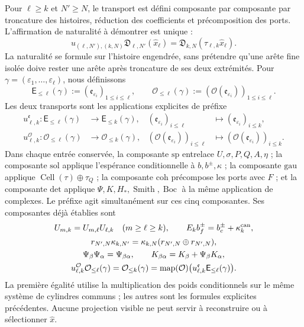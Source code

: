 Pour \(\ell\geq k\) et \(N'\geq N\), le transport est défini composante par composante par troncature des histoires, réduction des coefficients et précomposition des ports. L'affirmation de naturalité à démontrer est unique :
\begin{equation}
\label{eq:pdfv2-cor-naturalidad-unica}
 u_{(\ell,N'),(k,N)}\mathfrak D_{\ell,N'}(\widehat x_\ell)
 =\mathfrak D_{k,N}(\tau_{\ell,k}\widehat x_\ell).
\end{equation}
La naturalité se formule sur l'histoire engendrée, sans prétendre qu'une arête fine isolée doive rester une arête après troncature de ses deux extrémités. Pour \(\gamma=(\varepsilon_1,\ldots,\varepsilon_\ell)\), nous définissons
\[
 \mathsf E_{\leq\ell}(\gamma)
 :=(\mathfrak e_{\varepsilon_i})_{1\leq i\leq\ell},
 \qquad
 \mathcal O_{\leq\ell}(\gamma)
 :=(\mathcal O(\mathfrak e_{\varepsilon_i}))_{1\leq i\leq\ell}.
\]
Les deux transports sont les applications explicites de préfixe
\begin{align}
 u^{\mathfrak e}_{\ell,k}:
 \mathsf E_{\leq\ell}(\gamma)&\longrightarrow
 \mathsf E_{\leq k}(\gamma),&
 (\mathfrak e_{\varepsilon_i})_{i\leq\ell}
 &\longmapsto(\mathfrak e_{\varepsilon_i})_{i\leq k},
 \label{eq:pdfv2-cor-transporte-arista}\\
 u^{\mathcal O}_{\ell,k}:
 \mathcal O_{\leq\ell}(\gamma)&\longrightarrow
 \mathcal O_{\leq k}(\gamma),&
 (\mathcal O(\mathfrak e_{\varepsilon_i}))_{i\leq\ell}
 &\longmapsto
 (\mathcal O(\mathfrak e_{\varepsilon_i}))_{i\leq k}.
 \label{eq:pdfv2-cor-transporte-accion}
\end{align}
Dans chaque entrée conservée, la composante \(\mathrm{sp}\) entrelace \(U,\sigma,P,Q,A,\eta\) ; la composante \(\mathrm{sol}\) applique l'espérance conditionnelle à \(b,b^\pm,\kappa\) ; la composante \(\mathrm{gau}\) applique \(\operatorname{Cell}(\tau)\oplus\tau_Q\) ; la composante \(\mathrm{coh}\) précompose les ports avec \(F\) ; et la composante \(\mathrm{det}\) applique \(\Psi,K,H_*,\operatorname{Smith},\operatorname{Boc}\) à la même application de complexes. Le préfixe agit simultanément sur ces cinq composantes. Ses composantes déjà établies sont
\begin{equation}
\label{eq:pdfv2-cor-naturalidad-componentes}
 \begin{gathered}
 U_{m,k}=U_{m,\ell}U_{\ell,k}\quad(m\geq\ell\geq k),\qquad
 E_kb_f^\pm=b_c^\pm+\kappa_k^{\rm can},\\
 r_{N',N}\kappa_{k,N'}=
 \kappa_{k,N}(r_{N',N}\oplus r_{N',N}),\\
 \Psi_\beta\Psi_\alpha=\Psi_{\beta\alpha},
 \qquad K_{\beta\alpha}=K_\beta+\Psi_\beta K_\alpha,\\
 u^{\mathcal O}_{\ell,k}\mathcal O_{\leq\ell}(\gamma)
 =\mathcal O_{\leq k}(\gamma)
 =\operatorname{map}(\mathcal O)\bigl(u^{\mathfrak e}_{\ell,k}
                    \mathsf E_{\leq\ell}(\gamma)\bigr).
 \end{gathered}
\end{equation}
La première égalité utilise la multiplication des poids conditionnels sur le même système de cylindres communs ; les autres sont les formules explicites précédentes. Aucune projection visible ne peut servir à reconstruire ou à sélectionner \(\widehat x\).

